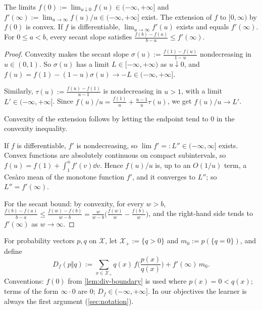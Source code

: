 \begin{lemma}\label{lem:div-boundary}
The limits $f(0):=\lim_{u\downarrow0}f(u)\in(-\infty,+\infty]$ and $f'(\infty):=\lim_{u\to\infty}f(u)/u\in(-\infty,+\infty]$ exist.
The extension of $f$ to $[0,\infty)$ by $f(0)$ is convex.
If $f$ is differentiable, $\lim_{u\to\infty}f'(u)$ exists and equals $f'(\infty)$.
For $0\le a<b$, every secant slope satisfies $\frac{f(b)-f(a)}{b-a}\le f'(\infty)$.
\end{lemma}
\begin{proof}
Convexity makes the secant slope $\sigma(u):=\frac{f(1)-f(u)}{1-u}$ nondecreasing in $u\in(0,1)$.
So $\sigma(u)$ has a limit $L\in[-\infty,+\infty)$ as $u\downarrow0$, and $f(u)=f(1)-(1-u)\sigma(u)\to-L\in(-\infty,+\infty]$.

Similarly, $\tau(u):=\frac{f(u)-f(1)}{u-1}$ is nondecreasing in $u>1$, with a limit $L'\in(-\infty,+\infty]$.
Since $f(u)/u=\frac{f(1)}u+\frac{u-1}u\tau(u)$, we get $f(u)/u\to L'$.

Convexity of the extension follows by letting the endpoint tend to $0$ in the convexity inequality.

If $f$ is differentiable, $f'$ is nondecreasing, so $\lim f'=:L''\in(-\infty,\infty]$ exists.
Convex functions are absolutely continuous on compact subintervals, so $f(u)=f(1)+\int_1^uf'(v)\dd v$.
Hence $f(u)/u$ is, up to an $O(1/u)$ term, a Ces\`aro mean of the monotone function $f'$, and it converges to $L''$; so $L''=f'(\infty)$.

For the secant bound: by convexity, for every $w>b$, $\frac{f(b)-f(a)}{b-a}\le\frac{f(w)-f(b)}{w-b}=\frac{w}{w-b}\big(\frac{f(w)}w-\frac{f(b)}w\big)$, and the right-hand side tends to $f'(\infty)$ as $w\to\infty$.
\end{proof}

\begin{definition}\label{def:div}
For probability vectors $p,q$ on $\mathcal X$, let $\mathcal X_+:=\{q>0\}$ and $m_0:=p(\{q=0\})$, and define
\[
D_f(p\Vert q):=\sum_{x\in\mathcal X_+}q(x)\,f\!\Big(\frac{p(x)}{q(x)}\Big)+f'(\infty)\,m_0 .
\]
Conventions: $f(0)$ from \cref{lem:div-boundary} is used where $p(x)=0<q(x)$; terms of the form $\infty\cdot0$ are $0$; $D_f\in(-\infty,+\infty]$.
In our objectives the learner is always the first argument (\cref{sec:notation}).
\end{definition}

